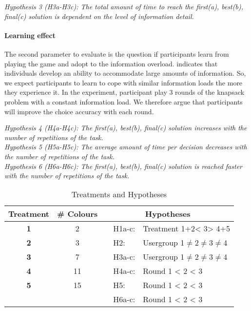 \textit{Hypothesis 3 (H3a-H3c): The total amount of time to reach the first(a), best(b), final(c) solution is dependent on the level of information detail. }

\paragraph{Learning effect}
The second parameter to evaluate is the question if participants learn from playing the game and adopt to the information overload. \cite{Jacoby1974} indicates that individuals develop an ability to accommodate large amounts of information. So, we expect participants to learn to cope with similar information loads the more they experience it. In the experiment, participant play 3 rounds of the knapsack problem with a constant information load. We therefore argue that participants will improve the choice accuracy with each round.


\textit{Hypothesis 4 (H4a-H4c): The first(a), best(b), final(c) solution increases with the number of repetitions of the task. }\\
\textit{Hypothesis 5 (H5a-H5c): The average amount of time per decision decreases with the number of repetitions of the task. }\\
\textit{Hypothesis 6 (H6a-H6c): The first(a), best(b), final(c) solution is reached faster with the number of repetitions of the task. }

\begin{table}[htbp] %
  \centering
  \caption{Treatments and Hypotheses}
  \label{tab:Hypotheses}
    \begin{tabular}{cc|rrr}
    \toprule
    \textbf{Treatment} & \textbf{\# Colours} & \multicolumn{3}{c}{\textbf{Hypotheses}} \\
    \midrule
    \textbf{1} & 2     &  & \multicolumn{1}{l}{H1a-c: } & \multicolumn{1}{l}{Treatment 1+2< 3> 4+5} \\
    \textbf{2} & 3     &       & \multicolumn{1}{l}{H2: } & \multicolumn{1}{l}{Usergroup 1$\neq$2$\neq$3$\neq$4} \\
    \textbf{3} & 7    &    &  \multicolumn{1}{l}{H3a-c: } & \multicolumn{1}{l}{Usergroup 1$\neq$2$\neq$3$\neq$4} \\
    \textbf{4} & 11    &    &  \multicolumn{1}{l}{H4a-c: } & \multicolumn{1}{l}{Round 1 < 2 < 3} \\
    \textbf{5} &  15	   &    &  \multicolumn{1}{l}{H5: } & \multicolumn{1}{l}{Round 1 < 2 < 3} \\
     & 		&    &  \multicolumn{1}{l}{H6a-c: } & \multicolumn{1}{l}{Round 1 < 2 < 3} \\
    \bottomrule
    \end{tabular}%
\end{table}%


